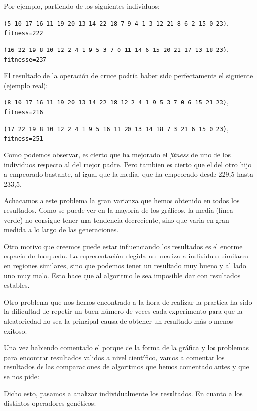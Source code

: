 \documentclass[a4paper,12pt,titlepage]{article}
\begin{document}
Por ejemplo, partiendo de los siguientes individuos:

\lstinline|(5 10 17 16 11 19 20 13 14 22 18 7 9 4 1 3 12 21 8 6 2 15 0 23)|, \\ 
\lstinline|fitness=222|

\lstinline|(16 22 19 8 10 12 2 4 1 9 5 3 7 0 11 14 6 15 20 21 17 13 18 23)|, \\ \lstinline|fitnesse=237|

El resultado de la operación de cruce podría haber sido perfectamente el siguiente (ejemplo real):

\lstinline|(8 10 17 16 11 19 20 13 14 22 18 12 2 4 1 9 5 3 7 0 6 15 21 23)|, \\ 
\lstinline|fitness=216|

\lstinline|(17 22 19 8 10 12 2 4 1 9 5 16 11 20 13 14 18 7 3 21 6 15 0 23)|, \\ 
\lstinline|fitness=251|

Como podemos observar, es cierto que ha mejorado el \textit{fitness} de uno de los individuos respecto al del mejor padre. Pero tambien es cierto que el del otro hijo a empeorado bastante, al igual que la media, que ha empeorado desde 229,5 hasta 233,5.

Achacamos a este problema la gran varianza que hemos obtenido en todos los resultados. Como se puede ver en la mayoría de los gráficos, la media (línea verde) no consigue tener una tendencia decreciente, sino que varia en gran medida a lo largo de las generaciones.

Otro motivo que creemos puede estar influenciando los resultados es el enorme espacio de busqueda. La representación elegida no localiza a individuos similares en regiones similares, sino que podemos tener un resultado muy bueno y al lado uno muy malo. Esto hace que al algoritmo le sea imposible dar con resultados estables.

Otro problema que nos hemos encontrado a la hora de realizar la practica ha sido la dificultad de repetir un buen número de veces cada experimento para que la aleatoriedad no sea la principal causa de obtener un resultado más o menos exitoso.

Una vez habiendo comentado el porque de la forma de la gráfica y los problemas para encontrar resultados validos a nivel científico, vamos a comentar los resultados de las comparaciones de algoritmos que hemos comentado antes y que se nos pide:

Dicho esto, pasamos a analizar individualmente los resultados. En cuanto a los distintos operadores genéticos:
\end{document}
